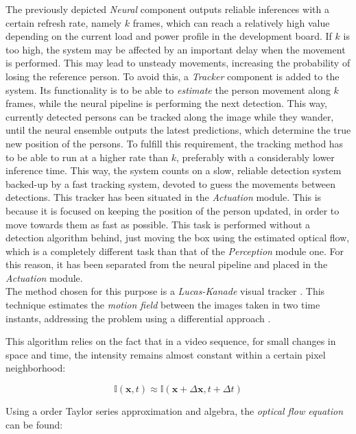 The previously depicted \textit{Neural} component outputs reliable inferences with a certain refresh rate, namely $k$ frames, which can reach a relatively high value depending on the current load and power profile in the development board. If $k$ is too high, the system may be affected by an important delay when the movement is performed. This may lead to unsteady movements, increasing the probability of losing the reference person. To avoid this, a \textit{Tracker} component is added to the system. Its functionality is to be able to \textit{estimate} the person movement along $k$ frames, while the neural pipeline is performing the next detection. This way, currently detected persons can be tracked along the image while they wander, until the neural ensemble outputs the latest predictions, which determine the true new position of the persons. To fulfill this requirement, the tracking method has to be able to run at a higher rate than $k$, preferably with a considerably lower inference time. This way, the system counts on a slow, reliable detection system backed-up by a fast tracking system, devoted to guess the movements between detections. This tracker has been situated in the \textit{Actuation} module. This is because it is focused on keeping the position of the person updated, in order to move towards them as fast as possible. This task is performed without a detection algorithm behind, just moving the box using the estimated optical flow, which is a completely different task than that of the \textit{Perception} module one. For this reason, it has been separated from the neural pipeline and placed in the \textit{Actuation} module.\\

The method chosen for this purpose is a \textit{Lucas-Kanade} visual tracker \cite{diapos_cv_motion_estimation}.  This technique estimates the \textit{motion field} between the images taken in two time instants, addressing the problem using a differential approach \cite{lucas_kanade}.

This algorithm relies on the fact that in a video sequence, for small changes in space and time, the intensity remains almost constant within a certain pixel neighborhood:

$$
\mathbb{I}(\mathbf{x}, t) \approx \mathbb{I}(\mathbf{x} + \Delta \textbf{x}, t + \Delta t)
$$

Using a  order Taylor series approximation and algebra, the \textit{optical flow equation} can be found\cite{lucas_kanade_tutorial}:

